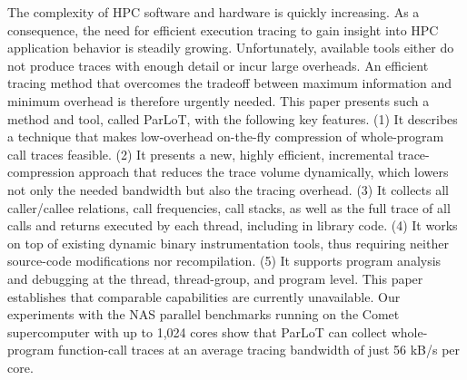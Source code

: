 The complexity of HPC software and hardware is quickly increasing. As a consequence, the need for efficient execution tracing to gain insight into HPC application behavior is steadily growing. Unfortunately, available tools either do not produce traces with enough detail or incur large overheads. An efficient tracing method that overcomes the tradeoff between maximum information and minimum overhead is therefore urgently needed. This paper presents such a method and tool, called ParLoT, with the following key features. (1) It describes a technique that makes low-overhead on-the-fly compression of whole-program call traces feasible. (2) It presents a new, highly efficient, incremental trace-compression approach that reduces the trace volume dynamically, which lowers not only the needed bandwidth but also the tracing overhead. (3) It collects all caller/callee relations, call frequencies, call stacks, as well as the full trace of all calls and returns executed by each thread, including in library code. (4) It works on top of existing dynamic binary instrumentation tools, thus requiring neither source-code modifications nor recompilation. (5) It supports program analysis and debugging at the thread, thread-group, and program level. 
This paper establishes that comparable capabilities are currently unavailable. Our experiments with the NAS parallel benchmarks running on the Comet supercomputer with up to 1,024 cores show that ParLoT can collect whole-program function-call traces at an average tracing bandwidth of just 56 kB/s per core.
